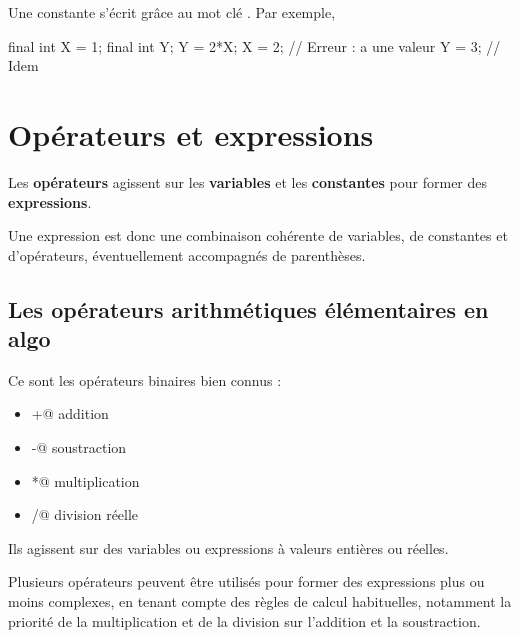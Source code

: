 \documentclass[11pt,a4paper]{article}
\begin{document}
				    Une constante s'\'ecrit gr\^ace au mot cl\'e \verb@final@.
            Par exemple,
\begin{Java}
final int X = 1;
final int Y;
Y = 2*X;
X = 2; // Erreur : a une valeur
Y = 3; // Idem
\end{Java}
            \par
        \section{Op\'erateurs et expressions}
				Les \textbf{op\'erateurs} agissent sur les \textbf{variables} 
				et les \textbf{constantes} pour former des \textbf{expressions}. 
      
            \par
        
				Une expression est donc une combinaison coh\'erente de variables, de constantes et d'op\'erateurs,
				\'eventuellement accompagn\'es de parenth\`eses.
			
            \par
        \subsection{Les op\'erateurs arithm\'etiques \'el\'ementaires en algo}
          Ce sont les op\'erateurs binaires bien connus :
          
					\begin{itemize}
				
			\item \verb@+@ addition
			\item \verb@-@ soustraction
			\item \verb@*@ multiplication
			\item \verb@/@ division r\'eelle
					\end{itemize}
				
          Ils agissent sur des variables ou expressions \`a valeurs enti\`eres ou r\'eelles. 
        
            \par
        
          Plusieurs op\'erateurs peuvent \^etre utilis\'es pour former des expressions plus ou moins complexes, 
          en tenant compte des r\`egles de calcul habituelles, notamment la priorit\'e de la multiplication et de la division
          sur l'addition et la soustraction. 
        
            \par
        
\end{document}
